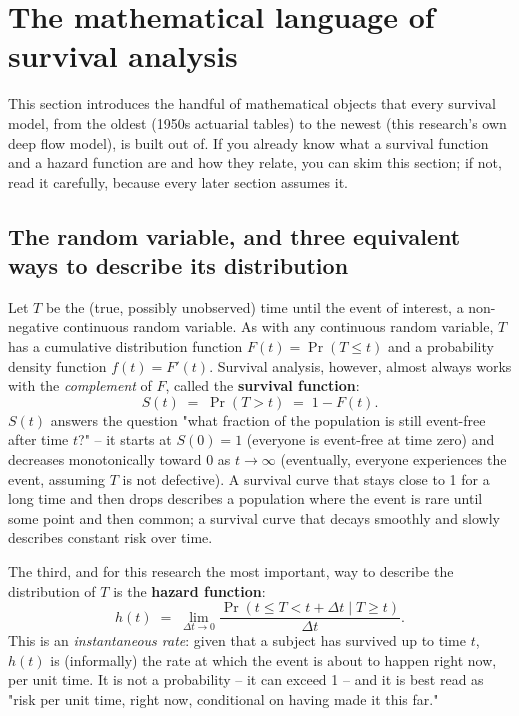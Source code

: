 \documentclass[11pt]{article}
\begin{document}
\section{The mathematical language of survival analysis}
\label{sec:math}

This section introduces the handful of mathematical objects that every
survival model, from the oldest (1950s actuarial tables) to the newest
(this research's own deep flow model), is built out of. If you already
know what a survival function and a hazard function are and how they
relate, you can skim this section; if not, read it carefully, because
every later section assumes it.

\subsection{The random variable, and three equivalent ways to describe its distribution}

Let $T$ be the (true, possibly unobserved) time until the event of
interest, a non-negative continuous random variable. As with any
continuous random variable, $T$ has a cumulative distribution function
$F(t) = \Pr(T \le t)$ and a probability density function $f(t) =
F'(t)$. Survival analysis, however, almost always works with the
\emph{complement} of $F$, called the \textbf{survival function}:
\begin{equation}
  S(t) \;=\; \Pr(T > t) \;=\; 1 - F(t).
  \label{eq:survival-def}
\end{equation}
$S(t)$ answers the question "what fraction of the population is still
event-free after time $t$?" -- it starts at $S(0) = 1$ (everyone is
event-free at time zero) and decreases monotonically toward $0$ as $t \to
\infty$ (eventually, everyone experiences the event, assuming $T$ is not
defective). A survival curve that stays close to 1 for a long time and
then drops describes a population where the event is rare until some
point and then common; a survival curve that decays smoothly and slowly
describes constant risk over time.

The third, and for this research the most important, way to describe the
distribution of $T$ is the \textbf{hazard function}:
\begin{equation}
  h(t) \;=\; \lim_{\Delta t \to 0} \frac{\Pr(t \le T < t + \Delta t \mid T \ge t)}{\Delta t}.
  \label{eq:hazard-def}
\end{equation}
This is an \emph{instantaneous rate}: given that a subject has survived
up to time $t$, $h(t)$ is (informally) the rate at which the event is
about to happen right now, per unit time. It is not a probability -- it
can exceed 1 -- and it is best read as "risk per unit time, right now,
conditional on having made it this far."
\end{document}
